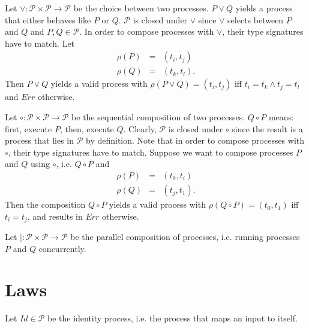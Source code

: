 Let $\vee \colon \mathcal{P} \times \mathcal{P} \to \mathcal{P}$ be the choice between two processes. $P \vee Q$ yields a process that either behaves like $P$ or $Q$. $\mathcal{P}$ is closed under $\vee$ since $\vee$ selects between $P$ and $Q$ and $P, Q \in \mathcal{P}$. In order to compose processes with $\vee$, their type signatures have to match. Let
\begin{eqnarray*}
  \rho \left( P \right) & = & \left( t_i, t_j \right) \\
  \rho \left( Q \right) & = & \left( t_k, t_l \right).
\end{eqnarray*}
Then $P \vee Q$ yields a valid process with $\rho \left( P \vee Q \right) = \left( t_i, t_j \right)$ iff $t_i = t_k \wedge t_j = t_l$ and $Err$ otherwise.

Let $\circ \colon \mathcal{P} \times \mathcal{P} \to \mathcal{P}$ be the sequential composition of two processes. $Q \circ P$ means: first, execute $P$, then, execute $Q$. Clearly, $\mathcal{P}$ is closed under $\circ$ since the result is a process that lies in $\mathcal{P}$ by definition. Note that in order to compose processes with $\circ$, their type signatures have to match. Suppose we want to compose processes $P$ and $Q$ using $\circ$, i.e. $Q \circ P$ and
\begin{eqnarray*}
  \rho \left( P \right) & = & \left( t_0, t_i \right) \\
  \rho \left( Q \right) & = & \left( t_j, t_1 \right).
\end{eqnarray*}
Then the composition $Q \circ P$ yields a valid process with $\rho \left( Q \circ P \right) = \left( t_0, t_1 \right)$ iff $t_i = t_j$, and results in $Err$ otherwise. 

Let $| \colon \mathcal{P} \times \mathcal{P} \to \mathcal{P}$ be the parallel composition of processes, i.e. running processes $P$ and $Q$ concurrently.

\section{Laws}
Let $Id \in \mathcal{P}$ be the identity process, i.e. the process that maps an input to itself.